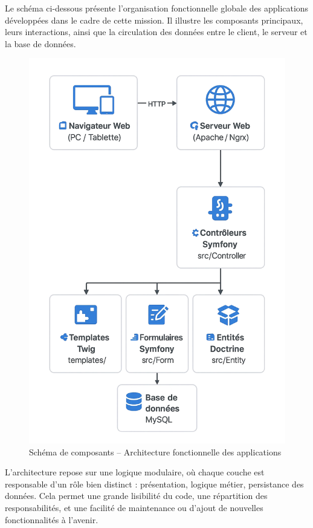 \documentclass[11pt,a4paper]{article}
\begin{document}
Le schéma ci-dessous présente l’organisation fonctionnelle globale des applications développées dans le cadre de cette mission. Il illustre les composants principaux, leurs interactions, ainsi que la circulation des données entre le client, le serveur et la base de données.

\begin{figure}[H]
    \centering
    \includegraphics[scale=0.30]{../Images/schema_composant} %
    \caption{Schéma de composants – Architecture fonctionnelle des applications}
    \label{fig:schema_composants}
\end{figure}

L’architecture repose sur une logique modulaire, où chaque couche est responsable d’un rôle bien distinct : présentation, logique métier, persistance des données. Cela permet une grande lisibilité du code, une répartition des responsabilités, et une facilité de maintenance ou d’ajout de nouvelles fonctionnalités à l’avenir.
\end{document}
